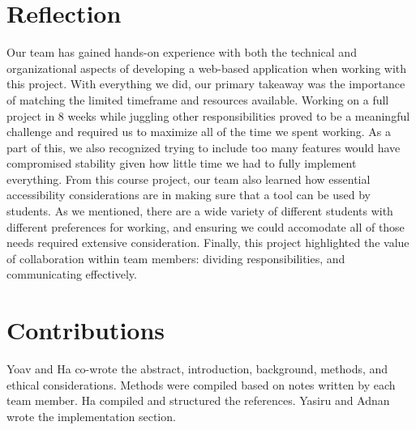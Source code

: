 \documentclass[11pt,oneside]{article}
\begin{document}
\section{Reflection}
Our team has gained hands-on experience with both the technical and organizational aspects of developing a web-based application when working with this project. With everything we did, our primary takeaway was the importance of matching the limited timeframe and resources available. Working on a full project in 8 weeks while juggling other responsibilities proved to be a meaningful challenge and required us to maximize all of the time we spent working. As a part of this, we also recognized trying to include too many features would have compromised stability given how little time we had to fully implement everything. From this course project, our team also learned how essential accessibility considerations are in making sure that a tool can be used by students. As we mentioned, there are a wide variety of different students with different preferences for working, and ensuring we could accomodate all of those needs required extensive consideration. Finally, this project highlighted the value of collaboration within team members: dividing responsibilities, and communicating effectively. 


\section{Contributions}
Yoav and Ha co-wrote the abstract, introduction, background, methods, and ethical considerations. Methods were compiled based on notes written by each team member. Ha compiled and structured the references. Yasiru and Adnan wrote the implementation section.




\end{document}
